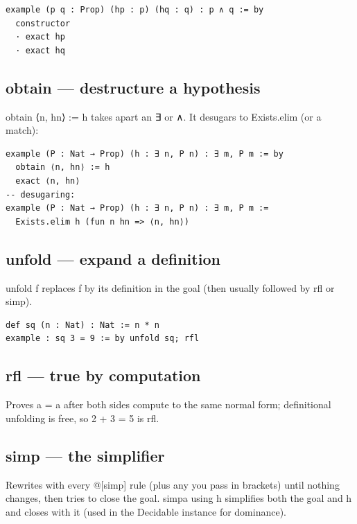 \documentclass[11pt, a4paper, oneside]{book}
\newcommand{\li}[1]{{\ttfamily\small\color{deepblue}#1}}
\begin{document}
\begin{leanbox}
\begin{verbatim}
example (p q : Prop) (hp : p) (hq : q) : p ∧ q := by
  constructor
  · exact hp
  · exact hq
\end{verbatim}
\end{leanbox}

\subsection*{\li{obtain} --- destructure a hypothesis}
\li{obtain ⟨n, hn⟩ := h} takes apart an \li{∃} or \li{∧}.  It desugars to
\li{Exists.elim} (or a \li{match}):

\begin{leanbox}
\begin{verbatim}
example (P : Nat → Prop) (h : ∃ n, P n) : ∃ m, P m := by
  obtain ⟨n, hn⟩ := h
  exact ⟨n, hn⟩
-- desugaring:
example (P : Nat → Prop) (h : ∃ n, P n) : ∃ m, P m :=
  Exists.elim h (fun n hn => ⟨n, hn⟩)
\end{verbatim}
\end{leanbox}

\subsection*{\li{unfold} --- expand a definition}
\li{unfold f} replaces \li{f} by its definition in the goal (then usually
followed by \li{rfl} or \li{simp}).

\begin{leanbox}
\begin{verbatim}
def sq (n : Nat) : Nat := n * n
example : sq 3 = 9 := by unfold sq; rfl
\end{verbatim}
\end{leanbox}

\subsection*{\li{rfl} --- true by computation}
Proves \li{a = a} after both sides compute to the same normal form; definitional
unfolding is free, so \li{2 + 3 = 5} is \li{rfl}.

\subsection*{\li{simp} --- the simplifier}
Rewrites with every \li{@[simp]} rule (plus any you pass in brackets) until
nothing changes, then tries to close the goal.  \li{simpa using h} simplifies
both the goal and \li{h} and closes with it (used in the \li{Decidable} instance
for dominance).
\end{document}
